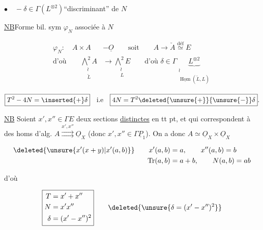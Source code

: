 $\bullet\quad-\delta\in\Gamma(L^{\otimes2})$\qquad ``discriminant'' de $N$

\uline{NB}\qquad Forme bil. sym $\varphi_N$ associée à $N$

\[
\begin{aligned}
\varphi_N:\quad A\times A&\mathbin{-}\underline O\qquad\text{soit}\qquad A\longrightarrow\check A\overset{\mathrm{déf}}{\simeq}E\\
\text{d'où}\qquad \underset{\substack{\wr\\\check L}}{\bigwedge^2 A}&\longrightarrow\underset{\substack{\wr\\L}}{\bigwedge^2 E}\qquad\text{d'où }\delta\in\Gamma\underbrace{L^{\otimes2}}_{\substack{\wr\\\underline{\operatorname{Hom}}(\check L,L)}}
\end{aligned}
\]


\[
\boxed{T^2-4N=\inserted{+}\delta}\quad\text{i.e}\quad\boxed{4N=T^2\deleted{\unsure{+}}{\unsure{-}}\delta}.
\]


\uline{NB} Soient $x',x''\in\Gamma E$ deux sections \uline{distinctes} en tt pt, et qui correspondent à des homs d'alg. $A\overset{x',x''}{\rightrightarrows}\underline O_X$ (donc $x',x''\in\Gamma\underline P_1$). On a donc $A\simeq\underline O_X\times\underline O_X$

\[
\begin{aligned}
\deleted{\unsure{x'(x+y)|x'(a,b)}}\qquad x'(a,b)&=a,\qquad x''(a,b)=b\\
\operatorname{Tr}(a,b)&=a+b,\qquad N(a,b)=ab
\end{aligned}
\]

d'où

\[
\boxed{\begin{aligned}T&=x'+x''\\N&=x'x''\\\delta&=(x'-x'')^2\end{aligned}}\qquad\deleted{\unsure{\delta=(x'-x'')^2}}
\]

